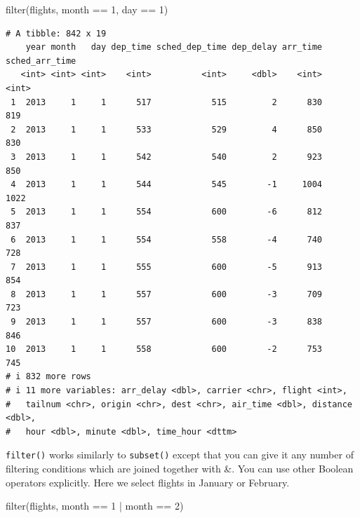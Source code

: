 \documentclass[
  letterpaper,
  DIV=11,
  numbers=noendperiod,
  oneside]{scrreprt}
\newenvironment{Shaded}{\begin{snugshade}}{\end{snugshade}}
\newcommand{\DecValTok}[1]{\textcolor[rgb]{0.68,0.00,0.00}{#1}}
\newcommand{\FunctionTok}[1]{\textcolor[rgb]{0.28,0.35,0.67}{#1}}
\newcommand{\NormalTok}[1]{\textcolor[rgb]{0.00,0.23,0.31}{#1}}
\newcommand{\SpecialCharTok}[1]{\textcolor[rgb]{0.37,0.37,0.37}{#1}}
\begin{document}
\begin{Shaded}
\begin{Highlighting}[]
\FunctionTok{filter}\NormalTok{(flights, month }\SpecialCharTok{==} \DecValTok{1}\NormalTok{, day }\SpecialCharTok{==} \DecValTok{1}\NormalTok{)}
\end{Highlighting}
\end{Shaded}

\begin{verbatim}
# A tibble: 842 x 19
    year month   day dep_time sched_dep_time dep_delay arr_time sched_arr_time
   <int> <int> <int>    <int>          <int>     <dbl>    <int>          <int>
 1  2013     1     1      517            515         2      830            819
 2  2013     1     1      533            529         4      850            830
 3  2013     1     1      542            540         2      923            850
 4  2013     1     1      544            545        -1     1004           1022
 5  2013     1     1      554            600        -6      812            837
 6  2013     1     1      554            558        -4      740            728
 7  2013     1     1      555            600        -5      913            854
 8  2013     1     1      557            600        -3      709            723
 9  2013     1     1      557            600        -3      838            846
10  2013     1     1      558            600        -2      753            745
# i 832 more rows
# i 11 more variables: arr_delay <dbl>, carrier <chr>, flight <int>,
#   tailnum <chr>, origin <chr>, dest <chr>, air_time <dbl>, distance <dbl>,
#   hour <dbl>, minute <dbl>, time_hour <dttm>
\end{verbatim}

\texttt{filter()} works similarly to \texttt{subset()} except that you
can give it any number of filtering conditions which are joined together
with \&. You can use other Boolean operators explicitly. Here we select
flights in January or February.

\begin{Shaded}
\begin{Highlighting}[]
\FunctionTok{filter}\NormalTok{(flights, month }\SpecialCharTok{==} \DecValTok{1} \SpecialCharTok{|}\NormalTok{ month }\SpecialCharTok{==} \DecValTok{2}\NormalTok{)}
\end{Highlighting}
\end{Shaded}
\end{document}
